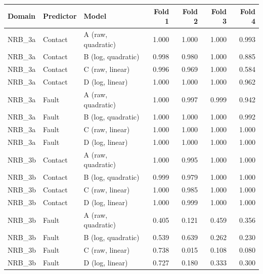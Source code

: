 \begin{tabular}{lllrrrr}
\toprule
Domain & Predictor & Model & Fold 1 & Fold 2 & Fold 3 & Fold 4 \\
\midrule
NRB\_3a & Contact & A (raw, quadratic) & 1.000 & 1.000 & 1.000 & 0.993 \\
NRB\_3a & Contact & B (log, quadratic) & 0.998 & 0.980 & 1.000 & 0.885 \\
NRB\_3a & Contact & C (raw, linear) & 0.996 & 0.969 & 1.000 & 0.584 \\
NRB\_3a & Contact & D (log, linear) & 1.000 & 1.000 & 1.000 & 0.962 \\
\addlinespace
NRB\_3a & Fault & A (raw, quadratic) & 1.000 & 0.997 & 0.999 & 0.942 \\
NRB\_3a & Fault & B (log, quadratic) & 1.000 & 1.000 & 1.000 & 0.992 \\
NRB\_3a & Fault & C (raw, linear) & 1.000 & 1.000 & 1.000 & 1.000 \\
NRB\_3a & Fault & D (log, linear) & 1.000 & 1.000 & 1.000 & 1.000 \\
\addlinespace
NRB\_3b & Contact & A (raw, quadratic) & 1.000 & 0.995 & 1.000 & 1.000 \\
NRB\_3b & Contact & B (log, quadratic) & 0.999 & 0.979 & 1.000 & 1.000 \\
NRB\_3b & Contact & C (raw, linear) & 1.000 & 0.985 & 1.000 & 1.000 \\
NRB\_3b & Contact & D (log, linear) & 1.000 & 0.999 & 1.000 & 1.000 \\
\addlinespace
NRB\_3b & Fault & A (raw, quadratic) & 0.405 & 0.121 & 0.459 & 0.356 \\
NRB\_3b & Fault & B (log, quadratic) & 0.539 & 0.639 & 0.262 & 0.230 \\
NRB\_3b & Fault & C (raw, linear) & 0.738 & 0.015 & 0.108 & 0.080 \\
NRB\_3b & Fault & D (log, linear) & 0.727 & 0.180 & 0.333 & 0.300 \\
\bottomrule
\end{tabular}
